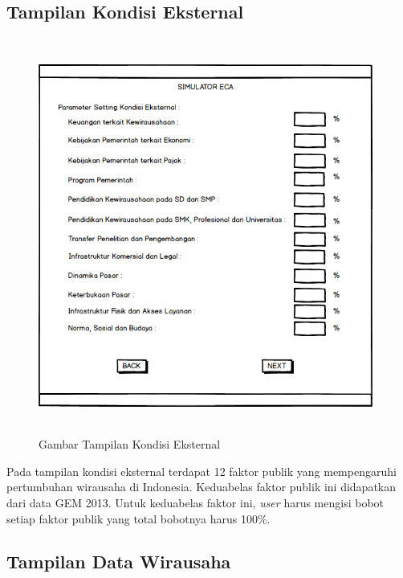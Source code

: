 \subsection{Tampilan Kondisi Eksternal}

\begin{figure} [H]
	\centering  
	\includegraphics[width=11cm, height=13cm]{mockup3} 
	\caption[Gambar Tampilan Kondisi Eksternal]{Gambar Tampilan Kondisi Eksternal}
	\label{fig:kondisiEksternal} 
\end{figure}

Pada tampilan kondisi eksternal terdapat 12 faktor publik yang mempengaruhi pertumbuhan wirausaha di Indonesia. Keduabelas faktor publik ini didapatkan dari data GEM 2013. Untuk keduabelas faktor ini, \textit{user} harus mengisi bobot setiap faktor publik yang total bobotnya harus 100\%. 

\subsection{Tampilan Data Wirausaha}

